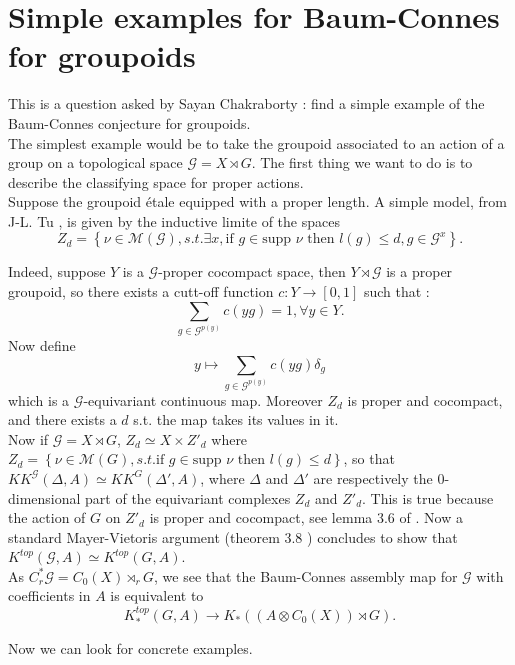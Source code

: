 \section{Simple examples for Baum-Connes for groupoids}

This is a question asked by Sayan Chakraborty : find a simple example of the Baum-Connes conjecture for groupoids.\\

The simplest example would be to take the groupoid associated to an action of a group on a topological space $\mathcal G = X\rtimes G$. The first thing we want to do is to describe the classifying space for proper actions.\\

Suppose the groupoid étale equipped with a proper length. A simple model, from J-L. Tu \cite{TuBC2}, is given by the inductive limite of the spaces
\[Z_d=\left\{\nu \in \mathcal M(\mathcal G), s.t. \exists x,\text{if } g\in \text{supp }\nu \text{ then } l(g)\leq d , g\in \mathcal G^x\right\}.\]

Indeed, suppose $Y$ is a $\mathcal G$-proper cocompact space, then $Y\rtimes \mathcal G$ is a proper groupoid, so there exists a cutt-off function $c : Y\rightarrow [0,1]$ such that : 
\[\sum_{g\in \mathcal G^{p(y)}} c(yg) = 1,\forall y \in Y.\]
Now define \[y \mapsto \sum_{g\in \mathcal G^{p(y)}} c(yg)\delta_g\]
which is a $\mathcal G$-equivariant continuous map. Moreover $Z_d$ is proper and cocompact, and there exists a $d$ s.t. the map takes its values in it.\\

Now if $\mathcal G = X\rtimes G$, $Z_d \simeq X\times Z'_d$ where $Z_d= \left\{ \nu \in \mathcal M(G), s.t. \text{if } g\in \text{supp }\nu \text{ then } l(g)\leq d\right\}$, so that
$KK^{\mathcal G}(\Delta,A)\simeq KK^G(\Delta', A)$, where $\Delta$ and $\Delta'$ are respectively the $0$-dimensional part of the equivariant complexes $Z_d$ and $Z'_d$. This is true because the action of $G$ on $Z'_d$ is proper and cocompact, see lemma $3.6$ of \cite{TuBC2}. Now a standard Mayer-Vietoris argument (theorem $3.8$ \cite{TuBC2}) concludes to show that 
$K^{top}(\mathcal G,A)\simeq K^{top}(G,A)$.\\

As $C^*_r \mathcal G = C_0(X)\rtimes_r G$, we see that the Baum-Connes assembly map for $\mathcal G$ with coefficients in $A$ is equivalent to 
\[K_*^{top}(G,A)\rightarrow K_*((A\otimes C_0(X))\rtimes G).\]

Now we can look for concrete examples.
